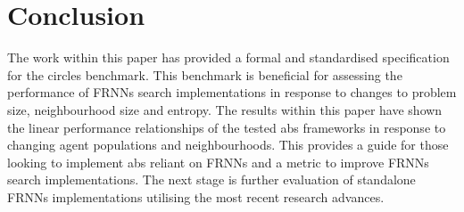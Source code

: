 \section{Conclusion\label{sec:conclusion}}
\vspace{-0.5cm}
  The work within this paper has provided a formal and standardised specification for the circles benchmark. This benchmark is beneficial for assessing the performance of FRNNs search implementations in response to changes to problem size, neighbourhood size and entropy. The results within this paper have shown the linear performance relationships of the tested \gls{abs} frameworks in response to changing agent populations and neighbourhoods. This provides a guide for those looking to implement \gls{abs} reliant on FRNNs and a metric to improve FRNNs search implementations. The next stage is further evaluation of standalone FRNNs implementations utilising the most recent research advances.